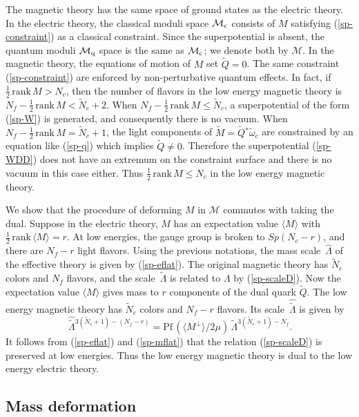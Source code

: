 \documentclass[lecture]{qft-l}
\newcommand{\om}{\omega}
\newcommand{\Lam}{\varLambda}
\newcommand{\bra}{\langle}
\newcommand{\ket}{\rangle}
\newcommand{\inv}[1]{\frac{1}{#1}}
\newcommand{\hf}{{\textstyle \inv{2}}}
\newcommand{\rank}{\mathrm{\,rank\,}}
\newcommand{\Pf}{\mathrm{Pf\,}}
\newcommand{\MM}{{\mathcal M}}
\newcommand{\MC}{\MM_{{\rm c}}}
\newcommand{\MQ}{\MM_{{\rm q}}}
\newcommand{\hLam}{\,\hat{\!\Lam}{}}
\newcommand{\tLam}{\,\tilde{\!\Lam}{}}
\newcommand{\htLam}{\,\hat{\tilde{\!\Lam}}{}}
\newcommand{\tM}{\tilde{M}{}}
\newcommand{\tQ}{\tilde{Q}{}}
\newcommand{\tN}{\tilde{N}_c}
\newcommand{\Mperp}{\bra M^\perp\ket}
\newcommand{\tom}{\tilde{\om}_c}
\def\Subhead#1{\subsection*{#1}}
\begin{document}
The magnetic theory has the same space of ground states as the electric theory.
In the electric theory, the classical moduli space $\MC$ consists of $M$
satisfying (\ref{sp-constraint}) as a classical constraint.
Since the superpotential is absent, the quantum moduli $\MQ$ space is 
the same as $\MC$; we denote both by $\MM$.
In the magnetic theory, the equations of motion of $M$ set $\tQ=0$. 
The same constraint (\ref{sp-constraint}) are enforced by non-perturbative
quantum effects.
In fact, if $\hf\rank M>N_c$, then the number of flavors in the low energy 
magnetic theory is $N_f-\hf\rank M<\tN+2$.
When $N_f-\hf\rank M\le\tN$, a superpotential of the form (\ref{sp-W}) is
generated, and consequently there is no vacuum.
When $N_f-\hf\rank M=\tN+1$, the light components of $\tM=\tQ^*\tom$ are
constrained by an equation like (\ref{sp-q}) which implies $\tQ\ne0$.
Therefore the superpotential (\ref{sp-WDD}) does not have an extremum
on the constraint surface and there is no vacuum in this case either.
Thus $\hf\rank M\le N_c$ in the low energy magnetic theory.

We show that the procedure of deforming $M$ in $\MM$ commutes with taking
the dual.
Suppose in the electric theory, $M$ has an expectation value
$\bra M\ket$ with $\hf\rank\bra M\ket=r$.
At low energies, the gauge group is broken to $Sp(N_c-r)$,
and there are $N_f-r$ light flavors.
Using the previous notations,
the mass scale $\hLam$ of the effective theory is given by (\ref{sp-eflat}).
The original magnetic theory has $\tN$ colors and $N_f$ flavors,
and the scale $\tLam$ is related to $\Lam$ by (\ref{sp-scaleD}).
Now the expectation value $\bra M\ket$ gives mass to $r$ components of 
the dual quark $\tQ$.
The low energy magnetic theory has $\tN$ colors and $N_f-r$ flavors.
Its scale $\htLam$ is given by
	\begin{equation}\label{sp-mflat}
\htLam^{3(\tN+1)-(N_f-r)}=\Pf(\Mperp/2\mu)\tLam^{3(\tN+1)-N_f}.
	\end{equation}
It follows from (\ref{sp-eflat}) and (\ref{sp-mflat}) that
the relation (\ref{sp-scaleD}) is preserved at low energies.
Thus the low energy magnetic theory is dual to the low energy electric theory.


\Subhead{Mass deformation}
\end{document}
